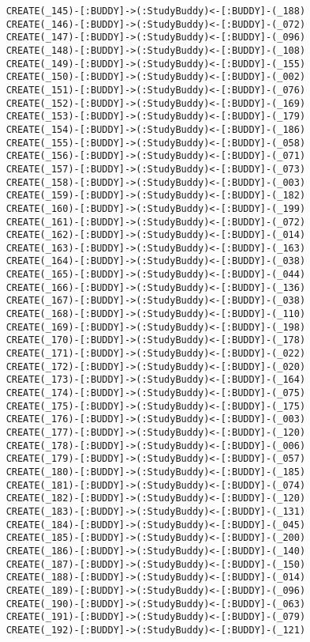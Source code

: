 \begin{lstlisting}
	CREATE(_145)-[:BUDDY]->(:StudyBuddy)<-[:BUDDY]-(_188)
	CREATE(_146)-[:BUDDY]->(:StudyBuddy)<-[:BUDDY]-(_072)
	CREATE(_147)-[:BUDDY]->(:StudyBuddy)<-[:BUDDY]-(_096)
	CREATE(_148)-[:BUDDY]->(:StudyBuddy)<-[:BUDDY]-(_108)
	CREATE(_149)-[:BUDDY]->(:StudyBuddy)<-[:BUDDY]-(_155)
	CREATE(_150)-[:BUDDY]->(:StudyBuddy)<-[:BUDDY]-(_002)
	CREATE(_151)-[:BUDDY]->(:StudyBuddy)<-[:BUDDY]-(_076)
	CREATE(_152)-[:BUDDY]->(:StudyBuddy)<-[:BUDDY]-(_169)
	CREATE(_153)-[:BUDDY]->(:StudyBuddy)<-[:BUDDY]-(_179)
	CREATE(_154)-[:BUDDY]->(:StudyBuddy)<-[:BUDDY]-(_186)
	CREATE(_155)-[:BUDDY]->(:StudyBuddy)<-[:BUDDY]-(_058)
	CREATE(_156)-[:BUDDY]->(:StudyBuddy)<-[:BUDDY]-(_071)
	CREATE(_157)-[:BUDDY]->(:StudyBuddy)<-[:BUDDY]-(_073)
	CREATE(_158)-[:BUDDY]->(:StudyBuddy)<-[:BUDDY]-(_003)
	CREATE(_159)-[:BUDDY]->(:StudyBuddy)<-[:BUDDY]-(_182)
	CREATE(_160)-[:BUDDY]->(:StudyBuddy)<-[:BUDDY]-(_199)
	CREATE(_161)-[:BUDDY]->(:StudyBuddy)<-[:BUDDY]-(_072)
	CREATE(_162)-[:BUDDY]->(:StudyBuddy)<-[:BUDDY]-(_014)
	CREATE(_163)-[:BUDDY]->(:StudyBuddy)<-[:BUDDY]-(_163)
	CREATE(_164)-[:BUDDY]->(:StudyBuddy)<-[:BUDDY]-(_038)
	CREATE(_165)-[:BUDDY]->(:StudyBuddy)<-[:BUDDY]-(_044)
	CREATE(_166)-[:BUDDY]->(:StudyBuddy)<-[:BUDDY]-(_136)
	CREATE(_167)-[:BUDDY]->(:StudyBuddy)<-[:BUDDY]-(_038)
	CREATE(_168)-[:BUDDY]->(:StudyBuddy)<-[:BUDDY]-(_110)
	CREATE(_169)-[:BUDDY]->(:StudyBuddy)<-[:BUDDY]-(_198)
	CREATE(_170)-[:BUDDY]->(:StudyBuddy)<-[:BUDDY]-(_178)
	CREATE(_171)-[:BUDDY]->(:StudyBuddy)<-[:BUDDY]-(_022)
	CREATE(_172)-[:BUDDY]->(:StudyBuddy)<-[:BUDDY]-(_020)
	CREATE(_173)-[:BUDDY]->(:StudyBuddy)<-[:BUDDY]-(_164)
	CREATE(_174)-[:BUDDY]->(:StudyBuddy)<-[:BUDDY]-(_075)
	CREATE(_175)-[:BUDDY]->(:StudyBuddy)<-[:BUDDY]-(_175)
	CREATE(_176)-[:BUDDY]->(:StudyBuddy)<-[:BUDDY]-(_003)
	CREATE(_177)-[:BUDDY]->(:StudyBuddy)<-[:BUDDY]-(_120)
	CREATE(_178)-[:BUDDY]->(:StudyBuddy)<-[:BUDDY]-(_006)
	CREATE(_179)-[:BUDDY]->(:StudyBuddy)<-[:BUDDY]-(_057)
	CREATE(_180)-[:BUDDY]->(:StudyBuddy)<-[:BUDDY]-(_185)
	CREATE(_181)-[:BUDDY]->(:StudyBuddy)<-[:BUDDY]-(_074)
	CREATE(_182)-[:BUDDY]->(:StudyBuddy)<-[:BUDDY]-(_120)
	CREATE(_183)-[:BUDDY]->(:StudyBuddy)<-[:BUDDY]-(_131)
	CREATE(_184)-[:BUDDY]->(:StudyBuddy)<-[:BUDDY]-(_045)
	CREATE(_185)-[:BUDDY]->(:StudyBuddy)<-[:BUDDY]-(_200)
	CREATE(_186)-[:BUDDY]->(:StudyBuddy)<-[:BUDDY]-(_140)
	CREATE(_187)-[:BUDDY]->(:StudyBuddy)<-[:BUDDY]-(_150)
	CREATE(_188)-[:BUDDY]->(:StudyBuddy)<-[:BUDDY]-(_014)
	CREATE(_189)-[:BUDDY]->(:StudyBuddy)<-[:BUDDY]-(_096)
	CREATE(_190)-[:BUDDY]->(:StudyBuddy)<-[:BUDDY]-(_063)
	CREATE(_191)-[:BUDDY]->(:StudyBuddy)<-[:BUDDY]-(_079)
	CREATE(_192)-[:BUDDY]->(:StudyBuddy)<-[:BUDDY]-(_121)

\end{lstlisting}
